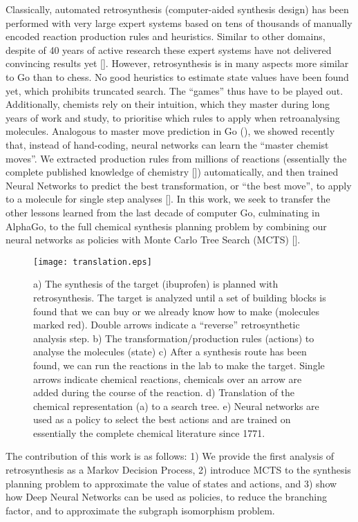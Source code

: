 \documentclass{article} %
\begin{document}
Classically, automated retrosynthesis (computer-aided synthesis design) has been performed with very large expert systems based on tens of thousands of manually encoded reaction production rules and heuristics. Similar to other domains, despite of 40 years of active research these expert systems have not delivered convincing results yet [\cite{todd2005computer,szymkuc2016computer}]. However, retrosynthesis is in many aspects more similar to Go than to chess. No good heuristics to estimate state values have been found yet, which prohibits truncated search. The ``games'' thus have to be played out. 
Additionally, chemists rely on their intuition, which they master during long years of work and study, to prioritise which rules to apply when retroanalysing molecules. Analogous to master move prediction in Go (\cite{maddison2014move}), we showed recently that, instead of hand-coding, neural networks can learn the ``master chemist moves''. We extracted production rules from millions of reactions  (essentially the complete published knowledge of chemistry [\cite{reaxys}]) automatically, and then trained Neural Networks to predict the best transformation, or ``the best move'', to apply to a molecule for single step analyses [\cite{neural-symbolic}].
%
 In this work, we seek to transfer the other lessons learned from the last decade of computer Go, culminating in AlphaGo, to the full chemical synthesis planning problem by combining our neural networks as policies with Monte Carlo Tree Search (MCTS) [\cite{silver2016mastering,browne2012survey}]. 
%
%
\begin{figure}[t]
\begin{center}
\texttt{[image: translation.eps]}
\caption{a) The synthesis of the target (ibuprofen) is planned with retrosynthesis. The target is analyzed until a set of building blocks is found that we can buy or we already know how to make (molecules marked red). Double arrows indicate a ``reverse'' retrosynthetic analysis step. b) The transformation/production rules (actions) to analyse the molecules (state) c) After a synthesis route has been found, we can run the reactions in the lab to make the target. Single arrows indicate chemical reactions, chemicals over an arrow are added during the course of the reaction. d) Translation of the chemical representation (a) to a search tree. e) Neural networks are used as a policy to select the best actions and are trained on essentially the complete chemical literature since 1771.}
\label{fig:retro}
\end{center}
\end{figure}
%
%
The contribution of this work is as follows: 1) We provide the first analysis of retrosynthesis as a Markov Decision Process, 2) introduce MCTS to the synthesis planning problem to approximate the value of states and actions, and 3) show how Deep Neural Networks can be used as policies, to reduce the branching factor, and to approximate the subgraph isomorphism problem.
\end{document}
